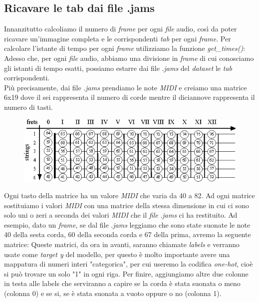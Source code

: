 \subsection{Ricavare le tab dai file .jams}
Innanzitutto calcoliamo il numero di \textit{frame} per ogni \textit{file} audio, così da poter ricavare un'immagine completa e le corrispondenti \textit{tab} per ogni \textit{frame}. Per calcolare l'istante di tempo per ogni \textit{frame} utilizziamo la funzione \textit{get\_times()}:
\vspace*{2ex}
\vspace*{2ex}
\noindent Adesso che, per ogni \textit{file} audio, abbiamo una divisione in \textit{frame} di cui conosciamo gli istanti di tempo esatti, possiamo estarre dai file .\textit{jams} del \textit{dataset} le \textit{tab} corrispondenti.\\ Più precisamente, dai file .\textit{jams} prendiamo le note \textit{MIDI} e creiamo una matrice 6x19 dove il sei rappresenta il numero di corde mentre il diciannove rappresenta il numero di tasti.
\vspace*{2ex}
\begin{figure}[H]
	\centering
	\includegraphics[scale=0.65]{./images/img11.png}
\end{figure}
\noindent Ogni tasto della matrice ha un valore \textit{MIDI} che varia da 40 a 82.
\vspace*{2ex}
\vspace*{2ex}
\noindent Ad ogni matrice sostituiamo i valori \textit{MIDI} con una matrice della stessa dimensione in cui ci sono solo uni o zeri a seconda dei valori \textit{MIDI} che il \textit{file} .\textit{jams} ci ha restituito. Ad esempio, dato un \textit{frame}, se dal file .\textit{jams} leggiamo che sono state suonate le note 40 della sesta corda, 60 della seconda corda e 67 della prima, avremo la seguente matrice:
\vspace*{2ex}
\noindent Queste matrici, da ora in avanti, saranno chiamate \textit{labels} e verranno usate come \textit{target y} del modello, per questo è molto importante avere una mappatura di numeri interi "categorica", per cui useremo la codifica \textit{one-hot}, cioè si può trovare un solo "1" in ogni riga. Per finire, aggiungiamo altre due colonne in testa alle labels che serviranno a capire se la corda è stata suonata o meno (colonna 0) e se si, se è stata suonata a vuoto oppure o no (colonna 1).\\
